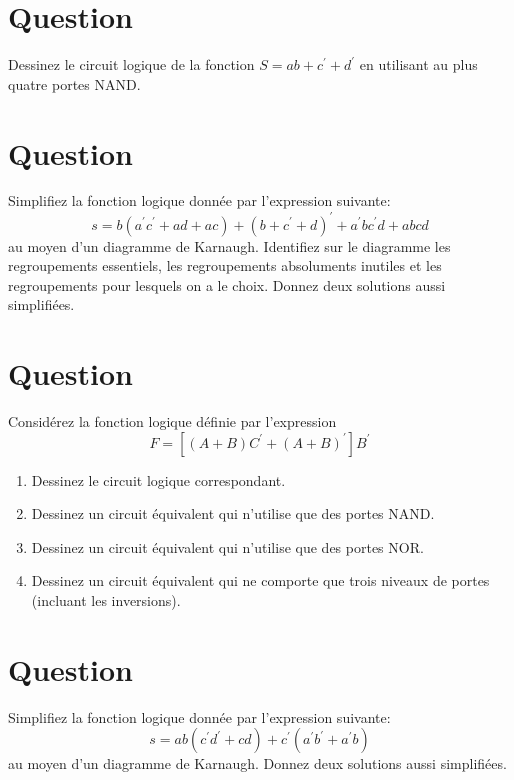\documentclass[letter, oneside]{book}
\begin{document}
\section*{Question}
\label{sec:org7a67a4c}
Dessinez le circuit logique de la fonction \(S = a b + c^\prime +
    d^\prime\) en utilisant au plus quatre portes NAND.

\section*{Question}
\label{sec:org6cce0ac}
Simplifiez la fonction logique donnée par l'expression suivante:
  $$
    s = b (a^{\prime} c^{\prime} + a d + a c) + (b + c^{\prime}+
      d)^{\prime} + a^{\prime} b c^{\prime} d + a b c d
    $$ 
  au moyen d'un
  diagramme de Karnaugh. Identifiez sur le diagramme les regroupements
  essentiels, les regroupements absoluments inutiles et les
  regroupements pour lesquels on a le choix. Donnez deux solutions
  aussi simplifiées.

\section*{Question}
\label{sec:orgd74e1fc}
Considérez la fonction logique définie par l'expression 
  $$
    F = [ (A + B) C^{\prime} + (A+B)^{\prime} ] B^{\prime}
    $$

\begin{enumerate}
\item Dessinez le circuit logique correspondant.

\item Dessinez un circuit équivalent qui n'utilise que des portes
NAND.

\item Dessinez un circuit équivalent qui n'utilise que des portes
NOR.

\item Dessinez un circuit équivalent qui ne comporte que trois niveaux de
portes (incluant les inversions).
\end{enumerate}

\section*{Question}
\label{sec:orga1a42f4}
Simplifiez la fonction logique donnée par l'expression suivante:
  $$
    s = a b ( c^{\prime} d^{\prime} + c d) + c^{\prime}(a^{\prime}
      b^{\prime} + a^{\prime} b)
    $$
   au moyen d'un diagramme de Karnaugh. Donnez deux solutions aussi simplifiées.
\end{document}
